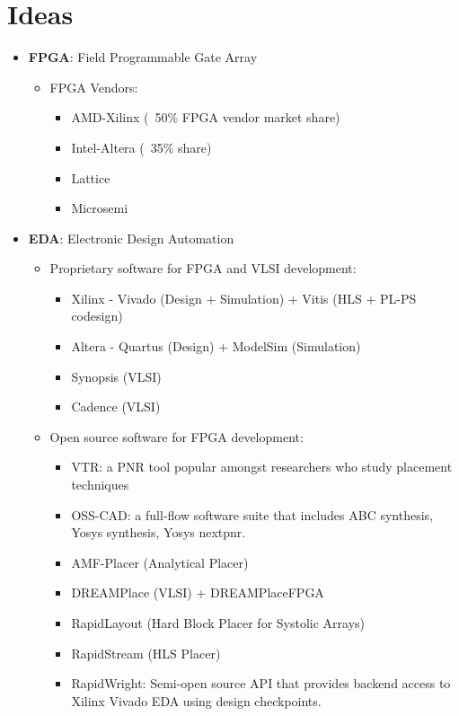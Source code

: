 \documentclass{article}
\begin{document}
\section{Ideas}
\begin{itemize}[label={\textbullet}, left=0.25cm]
    \item \textbf{FPGA}: Field Programmable Gate Array
    \begin{itemize}[label={--}, left=0.25cm]
        \item FPGA Vendors:
        \begin{itemize}[label={$\cdot$}, left=0.25cm]
            \item AMD-Xilinx (~50\% FPGA vendor market share)
            \item Intel-Altera (~35\% share)
            \item Lattice
            \item Microsemi
        \end{itemize}
    \end{itemize}

    \item \textbf{EDA}: Electronic Design Automation
    \begin{itemize}[label={--}, left=0.25cm]
        \item Proprietary software for FPGA and VLSI development:
        \begin{itemize}[label={$\cdot$}, left=0.25cm]
            \item Xilinx - Vivado (Design + Simulation) + Vitis (HLS + PL-PS codesign)
            \item Altera - Quartus (Design) + ModelSim (Simulation)
            \item Synopsis (VLSI)
            \item Cadence (VLSI)
        \end{itemize}
        \item Open source software for FPGA development:
        \begin{itemize}[label={$\cdot$}, left=0.25cm]
            \item VTR: a PNR tool popular amongst researchers who study placement techniques
            \item OSS-CAD: a full-flow software suite that includes ABC synthesis, Yosys synthesis, Yosys nextpnr.
            \item AMF-Placer (Analytical Placer)
            \item DREAMPlace (VLSI) + DREAMPlaceFPGA
            \item RapidLayout (Hard Block Placer for Systolic Arrays)
            \item RapidStream (HLS Placer)
            \item RapidWright: Semi-open source API that provides backend access to Xilinx Vivado EDA using design checkpoints.
        \end{itemize}
    \end{itemize}
    

\end{itemize}
\end{document}
